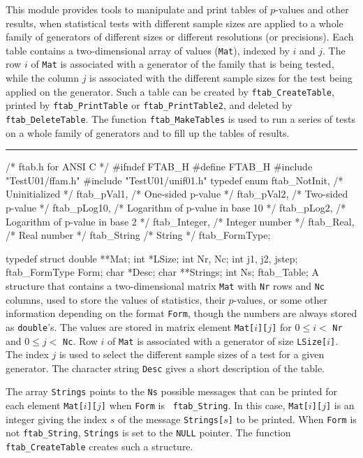 
This module provides tools to manipulate and print tables of $p$-values
and other results, when statistical tests with different sample sizes are
applied to a whole family of generators of different sizes or different
resolutions (or precisions). Each table contains a two-dimensional array of
values ({\tt Mat}), indexed by $i$ and $j$. The row $i$ of {\tt Mat} is
associated with a generator of the family that is being tested, while the
column $j$ is associated with the different sample sizes for the test
being applied on the generator. Such a table can be created by
{\tt ftab\_CreateTable}, printed by {\tt ftab\_PrintTable} or
{\tt ftab\_PrintTable2}, and deleted by {\tt ftab\_DeleteTable}.
The function {\tt ftab\_MakeTables} is used to run a series of tests on a
whole family of generators and to fill up the tables of results.

\bigskip
\hrule
\code\hide
/* ftab.h for ANSI C */
#ifndef FTAB_H
#define FTAB_H
\endhide
#include "TestU01/ffam.h"
#include "TestU01/unif01.h"
\endcode
\code
\hide
typedef enum {
   ftab_NotInit,              /* Uninitialized */
   ftab_pVal1,                /* One-sided p-value */
   ftab_pVal2,                /* Two-sided p-value */
   ftab_pLog10,               /* Logarithm of p-value in base 10 */
   ftab_pLog2,                /* Logarithm of p-value in base 2 */
   ftab_Integer,              /* Integer number */
   ftab_Real,                 /* Real number */
   ftab_String                /* String */
} ftab_FormType;
\endhide

typedef struct {
   double **Mat;
   int *LSize;
   int Nr, Nc;
   int j1, j2, jstep;
   ftab_FormType Form;
   char *Desc;
   char **Strings;
   int Ns;
} ftab_Table;
\endcode
 \tab
  A structure that contains a two-dimensional matrix {\tt Mat} with {\tt Nr}
  rows and {\tt Nc} columns, used to store the values of statistics, their
  $p$-values, or some other information depending on the format {\tt Form},
  though the numbers are always stored as {\tt double}'s.
  The values are stored in matrix element {\tt Mat[$i$][$j$]} for
  $0 \le i <$ {\tt Nr} and $0 \le j <$ {\tt Nc}. Row $i$ of {\tt Mat}
  is associated with a generator of size {\tt LSize[$i$]}. The index $j$ is
  used to select the different sample sizes of a test for a given
  generator. The character string {\tt Desc} gives a short description of
  the table.

  The array {\tt Strings} points to the {\tt Ns} possible messages that can
  be printed for each element {\tt Mat[$i$][$j$]} when {\tt Form} is {\tt
  ftab\_String}. In this case, {\tt Mat[$i$][$j$]} is an integer giving the
  index $s$ of the message {\tt Strings[$s$]} to be printed. When {\tt Form}
  is not {\tt ftab\_String}, {\tt Strings} is set to the {\tt NULL}
  pointer.
  The function {\tt ftab\_CreateTable} creates such a structure.
 \endtab




